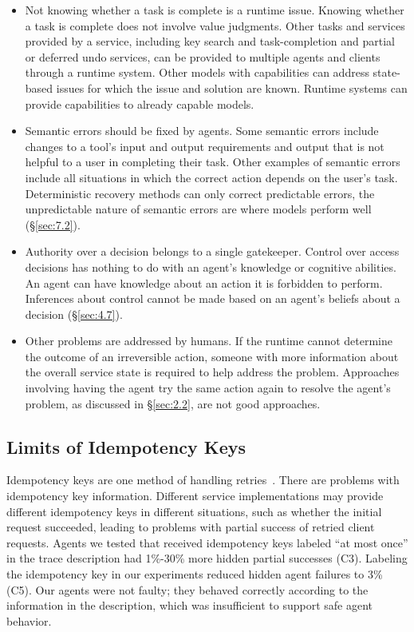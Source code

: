 \documentclass[letterpaper,twocolumn,10pt]{article}
\begin{document}
\begin{itemize}
\item Not knowing whether a task is complete is a runtime issue. Knowing whether a task is complete does not involve value judgments. Other tasks and services provided by a service, including key search and task-completion and partial or deferred undo services, can be provided to multiple agents and clients through a runtime system. Other models with capabilities can address state-based issues for which the issue and solution are known. Runtime systems can provide capabilities to already capable models.
\item Semantic errors should be fixed by agents. Some semantic errors include changes to a tool's input and output requirements and output that is not helpful to a user in completing their task. Other examples of semantic errors include all situations in which the correct action depends on the user's task. Deterministic recovery methods can only correct predictable errors, the unpredictable nature of semantic errors are where models perform well (\S\ref{sec:7.2}).
\item Authority over a decision belongs to a single gatekeeper. Control over access decisions has nothing to do with an agent's knowledge or cognitive abilities. An agent can have knowledge about an action it is forbidden to perform. Inferences about control cannot be made based on an agent's beliefs about a decision (\S\ref{sec:4.7}).
\item Other problems are addressed by humans. If the runtime cannot determine the outcome of an irreversible action, someone with more information about the overall service state is required to help address the problem. Approaches involving having the agent try the same action again to resolve the agent's problem, as discussed in \S\ref{sec:2.2}, are not good approaches.
\end{itemize}

\subsection{Limits of Idempotency Keys}\label{sec:2.4}

Idempotency keys are one method of handling retries~\cite{lee2015rifl,jena2025idempotency}. There are problems with idempotency key information. Different service implementations may provide different idempotency keys in different situations, such as whether the initial request succeeded, leading to problems with partial success of retried client requests. Agents we tested that received idempotency keys labeled ``at most once'' in the trace description had 1\%-30\% more hidden partial successes (C3). Labeling the idempotency key in our experiments reduced hidden agent failures to 3\% (C5). Our agents were not faulty; they behaved correctly according to the information in the description, which was insufficient to support safe agent behavior.
\end{document}

